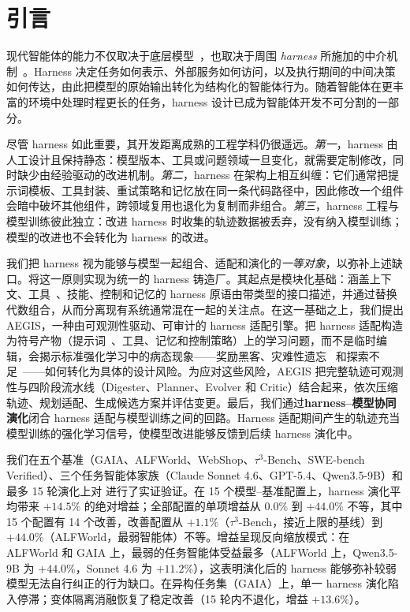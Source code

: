 \section{引言}
\label{sec:intro}

现代智能体的能力不仅取决于底层模型~\cite{deepseekai2026deepseekv4,glm5team2026glm5vibecodingagentic, yang2025qwen3,team2023gemini}，也取决于周围 \textit{harness} 所施加的中介机制~\cite{lu2026openclaw,liagent,claudecode}。Harness 决定任务如何表示、外部服务如何访问，以及执行期间的中间决策如何传达，由此把模型的原始输出转化为结构化的智能体行为。随着智能体在更丰富的环境中处理时程更长的任务，harness 设计已成为智能体开发不可分割的一部分。

尽管 harness 如此重要，其开发距离成熟的工程学科仍很遥远。\textit{第一}，harness 由人工设计且保持静态：模型版本、工具或问题领域一旦变化，就需要定制修改，同时缺少由经验驱动的改进机制。\textit{第二}，harness 在架构上相互纠缠：它们通常把提示词模板、工具封装、重试策略和记忆放在同一条代码路径中，因此修改一个组件会暗中破坏其他组件，跨领域复用也退化为复制而非组合。\textit{第三}，harness 工程与模型训练彼此独立：改进 harness 时收集的轨迹数据被丢弃，没有纳入模型训练；模型的改进也不会转化为 harness 的改进。

我们把 harness 视为能够与模型一起组合、适配和演化的\textit{一等对象}，以弥补上述缺口。\ProjectName 将这一原则实现为统一的 harness 铸造厂。其起点是模块化基础：涵盖上下文、工具~\cite{feng2025retool}、技能、控制和记忆的 harness 原语由带类型的接口描述，并通过替换代数组合，从而分离现有系统通常混在一起的关注点。在这一基础之上，我们提出 AEGIS，一种由可观测性驱动、可审计的 harness 适配引擎。把 harness 适配构造为符号产物（提示词~\cite{zhou2025proposer}、工具、记忆和控制策略）上的学习问题，而不是临时编辑，会揭示标准强化学习中的病态现象——奖励黑客、灾难性遗忘~\cite{kirkpatrick2017overcoming} 和探索不足~\cite{ladosz2022exploration}——如何转化为具体的设计风险。为应对这些风险，AEGIS 把完整轨迹可观测性与四阶段流水线（Digester、Planner、Evolver 和 Critic）结合起来，依次压缩轨迹、规划适配、生成候选方案并评估变更。最后，我们通过\textbf{harness--模型协同演化}闭合 harness 适配与模型训练之间的回路。Harness 适配期间产生的轨迹充当模型训练的强化学习信号，使模型改进能够反馈到后续 harness 演化中。

我们在五个基准（GAIA、ALFWorld、WebShop、$\tau^3$-Bench、SWE-bench Verified）、三个任务智能体家族（Claude Sonnet 4.6、GPT-5.4、Qwen3.5-9B）和最多 15 轮演化上对 \textbf{\ProjectName} 进行了实证验证。在 15 个模型--基准配置上，harness 演化平均带来 $+14.5\%$ 的绝对增益；全部配置的单项增益从 $0.0\%$ 到 $+44.0\%$ 不等，其中 15 个配置有 14 个改善，改善配置从 $+1.1\%$（$\tau^3$-Bench，接近上限的基线）到 $+44.0\%$（ALFWorld，最弱智能体）不等。增益呈现反向缩放模式：在 ALFWorld 和 GAIA 上，最弱的任务智能体受益最多（ALFWorld 上，Qwen3.5-9B 为 $+44.0\%$，Sonnet 4.6 为 $+11.2\%$），这表明演化后的 harness 能够弥补较弱模型无法自行纠正的行为缺口。在异构任务集（GAIA）上，单一 harness 演化陷入停滞；变体隔离消融恢复了稳定改善（15 轮内不退化，增益 $+13.6\%$）。

